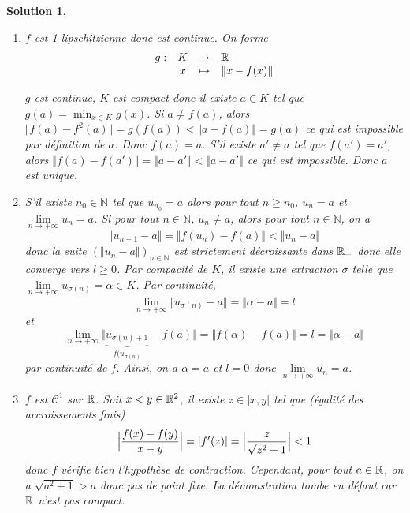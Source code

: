 \documentclass[12pt]{article}
\newtheorem{solution}{Solution}[section]
\theoremstyle{remark}
\newcommand{\N}{\mathbb{N}} \newcommand{\Z}{\mathbb{Z}}
\newcommand{\function}[5]{
	$$
	\begin{array}{rccl}
		#1: & #2 & \to & #3 \\
		& #4 & \mapsto & #5
	\end{array}
	$$
}
\begin{document}
\begin{solution}
	\phantom{}
	\begin{enumerate}
		\item $f$ est 1-lipschitzienne donc est continue. On forme \function{g}{K}{\R}{x}{\Vert x-f(x)\Vert}
		$g$ est continue, $K$ est compact donc il existe $a\in K$ tel que $g(a)=\min_{x\in K}g(x)$. Si $a\neq f(a)$, alors $\Vert f(a)-f^{2}(a)\Vert=g(f(a))<\Vert a-f(a)\Vert=g(a)$ ce qui est impossible par définition de $a$. Donc $f(a)=a$. S'il existe $a'\neq a$ tel que $f(a')=a'$, alors $\Vert f(a)-f(a')\Vert=\Vert a-a'\Vert<\Vert a-a'\Vert$ ce qui est impossible. Donc $a$ est unique.

		\item S'il existe $n_{0}\in\N$ tel que $u_{n_{0}}=a$ alors pour tout $n\geqslant n_{0}$, $u_{n}=a$ et $\lim\limits_{n\to+\infty}u_{n}=a$. Si pour tout $n\in\N$, $u_{n}\neq a$, alors pour tout $n\in\N$, on a
		$$\Vert u_{n+1}-a\Vert=\Vert f(u_{n})-f(a)\Vert<\Vert u_{n}-a\Vert$$
		donc la suite $(\Vert u_{n}-a\Vert)_{n\in\N}$ est strictement décroissante dans $\mathbb{R}_{+}$ donc elle converge vers $l\geqslant0$. Par compacité de $K$, il existe une extraction $\sigma$ telle que $\lim\limits_{n\to+\infty}u_{\sigma(n)}=\alpha\in K$. Par continuité, $$\lim\limits_{n\to+\infty}\Vert u_{\sigma(n)}-a\Vert=\Vert\alpha-a\Vert=l$$ 
		et
		$$\lim\limits_{n\to+\infty}\Vert \underbrace{u_{\sigma(n)+1}}_{f(u_{\sigma(n)}}-f(a)\Vert=\Vert f(\alpha)-f(a)\Vert=l=\Vert\alpha-a\Vert$$
		par continuité de $f$.
		Ainsi, on a $\alpha=a$ et $l=0$ donc $\lim\limits_{n\to+\infty}u_{n}=a$.

		\item $f$ est $\mathcal{C}^{1}$ sur $\mathbb{R}$. Soit $x<y\in\mathbb{R}^{2}$, il existe $z\in]x,y[$ tel que (égalité des accroissements finis)
		$$\Bigl\lvert\frac{f(x)-f(y)}{x-y}\Bigr\rvert=\vert f'(z)\vert=\Bigl\lvert\frac{z}{\sqrt{z^{2}+1}}\Bigr\rvert<1$$
		donc $f$ vérifie bien l'hypothèse de contraction. Cependant, pour tout $a\in\mathbb{R}$, on a $\sqrt{a^{2}+1}>a$ donc pas de point fixe. La démonstration tombe en défaut car $\mathbb{R}$ n'est pas compact.
	\end{enumerate}
\end{solution}
\end{document}
